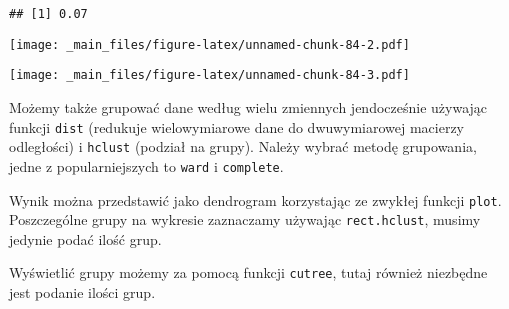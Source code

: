 \documentclass[
]{book}
\newenvironment{Shaded}{\begin{snugshade}}{\end{snugshade}}
\newcommand{\AttributeTok}[1]{\textcolor[rgb]{0.77,0.63,0.00}{#1}}
\newcommand{\CommentTok}[1]{\textcolor[rgb]{0.56,0.35,0.01}{\textit{#1}}}
\newcommand{\DecValTok}[1]{\textcolor[rgb]{0.00,0.00,0.81}{#1}}
\newcommand{\FunctionTok}[1]{\textcolor[rgb]{0.00,0.00,0.00}{#1}}
\newcommand{\NormalTok}[1]{#1}
\newcommand{\OtherTok}[1]{\textcolor[rgb]{0.56,0.35,0.01}{#1}}
\newcommand{\SpecialCharTok}[1]{\textcolor[rgb]{0.00,0.00,0.00}{#1}}
\begin{document}
\begin{verbatim}
## [1] 0.07
\end{verbatim}

\begin{Shaded}
\end{Shaded}

\texttt{[image: \_main\_files/figure-latex/unnamed-chunk-84-2.pdf]}

\begin{Shaded}
\end{Shaded}

\texttt{[image: \_main\_files/figure-latex/unnamed-chunk-84-3.pdf]}

Możemy także grupować dane według wielu zmiennych jendocześnie używając funkcji \texttt{dist} (redukuje wielowymiarowe dane do dwuwymiarowej macierzy odległości) i \texttt{hclust} (podział na grupy). Należy wybrać metodę grupowania, jedne z popularniejszych to \texttt{ward} i \texttt{complete}.

Wynik można przedstawić jako dendrogram korzystając ze zwykłej funkcji \texttt{plot}. Poszczególne grupy na wykresie zaznaczamy używając \texttt{rect.hclust}, musimy jedynie podać ilość grup.

Wyświetlić grupy możemy za pomocą funkcji \texttt{cutree}, tutaj również niezbędne jest podanie ilości grup.
\end{document}
